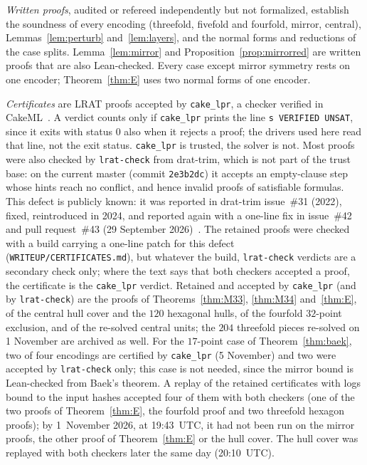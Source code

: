 \documentclass[11pt]{article}
\theoremstyle{remark}
\begin{document}
\emph{Written proofs}, audited or refereed independently but not formalized, establish the soundness of every encoding
(threefold, fivefold and fourfold, mirror, central), Lemmas~\ref{lem:perturb} and~\ref{lem:layers}, and the normal
forms and reductions of the case splits. Lemma~\ref{lem:mirror} and Proposition~\ref{prop:mirrorred} are written proofs
that are also Lean-checked. Every case except mirror symmetry rests on one encoder; Theorem~\ref{thm:E} uses two normal
forms of one encoder.

\emph{Certificates} are LRAT proofs accepted by \texttt{cake\_lpr}, a checker verified in CakeML~\cite{THM21}. A
verdict counts only if \texttt{cake\_lpr} prints the line \texttt{s VERIFIED UNSAT}, since it exits with status $0$ also
when it rejects a proof; the drivers used here read that line, not the exit status. \texttt{cake\_lpr} is trusted, the
solver is not. Most proofs were also checked by \texttt{lrat-check} from drat-trim, which is not part of the trust base:
on the current master (commit \texttt{2e3b2dc}) it accepts an empty-clause step whose hints reach no conflict, and hence
invalid proofs of satisfiable formulas. This defect is publicly known: it was reported in drat-trim issue~\#31 (2022),
fixed, reintroduced in 2024, and reported again with a one-line fix in issue~\#42 and pull request~\#43 (29 September
2026)~\cite{DT}. The retained proofs were checked with a build carrying a one-line patch for this defect
(\texttt{WRITEUP/CERTIFICATES.md}), but whatever the build, \texttt{lrat-check} verdicts are a secondary check only; where the text says that both checkers accepted a proof, the certificate is the
\texttt{cake\_lpr} verdict. Retained and accepted by \texttt{cake\_lpr} (and by \texttt{lrat-check}) are the proofs of
Theorems~\ref{thm:M33}, \ref{thm:M34} and~\ref{thm:E}, of the central hull cover and the $120$ hexagonal hulls, of the
fourfold $32$-point exclusion, and of the re-solved central units; the $204$ threefold pieces re-solved on 1 November
are archived as well. For the $17$-point case of Theorem~\ref{thm:baek}, two of four encodings are certified by
\texttt{cake\_lpr} (5 November) and two were accepted by \texttt{lrat-check} only; this case is not needed, since the
mirror bound is Lean-checked from Baek's theorem. A replay of the retained certificates with logs bound to
the input hashes accepted four of them with both checkers (one of the two proofs of Theorem~\ref{thm:E}, the fourfold
proof and two threefold hexagon proofs); by 1~November 2026, at 19:43~UTC, it had not been run on the mirror proofs,
the other proof of Theorem~\ref{thm:E} or the hull cover. The hull cover was replayed with both checkers later the same day (20:10~UTC).
\end{document}
